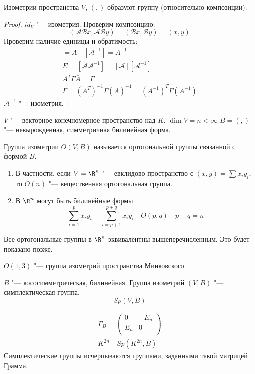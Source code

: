 \begin{conseq}
	Изометрии пространства $V$, $(,)$ образуют группу (относительно композиции).
\end{conseq}
\begin{proof}
	$id_V $  "--- изометрия.
	Проверим композицию:
	\[ (\mathcal A \mathcal B x, \mathcal A \mathcal B y) = (\mathcal B x, \mathcal B y) = (x, y) \]
	Проверим наличие единицы и обратимость:
	\begin{gather*}
		[\mathcal A ] = A \quad [\mathcal A ^{-1}] = A ^{-1} \\
		E = [\mathcal A \mathcal A ^{-1}] = [\mathcal A] [\mathcal A ^{-1}] \\
		A^T \Gamma \bar A  = \Gamma \\
		\Gamma = (A^T)^{-1} \Gamma (\bar A)^{-1} = (A^{-1})^T \Gamma \overline{(A^{-1})}
	\end{gather*}
	$\mathcal A^{-1}$ "--- изометрия.
\end{proof}

\begin{Def}
	$V$ "--- векторное конечномерное пространство над $K$. $\dim V = n < \infty$
	$B = (,)$ "--- невырожденная, симметричная билинейная форма.

	Группа изометрии $O(V, B)$ называется ортогональной группы связанной с формой $B$.  
\end{Def}
\begin{Def}
    \begin{enumerate}
    \item В частности, если $V = \R^n$ "--- евклидово пространство с $(x, y) = \sum x_i y_i$,
        	то $O(n)$ "--- вещественная ортогональная группа.
     \item  В $\R^n$ могут быть билинейные формы
     \[ \sum_{i = 1}^p x_iy_i - \sum_{i = p + 1}^{p + q} x_i y_i \quad O(p, q) \quad p + q = n \]
    \end{enumerate}
Все ортогональные группы в $\R^n$ эквивалентны вышеперечисленным.
Это будет показано позже.
\end{Def}
\begin{exmp}
$O(1, 3)$ "--- группа изометрий пространства Минковского.
\end{exmp}

\begin{Def}
	$B$ "--- кососимметрическая, билинейная.
	Группа изометрий $(V, B)$ "--- симплектическая группа.
	\[ Sp(V, B) \]
\end{Def}

\begin{exmp}
	\begin{gather*}
		\Gamma_B = \begin{pmatrix} 0 & -E_n \\ E_n & 0 \\ \end{pmatrix} \\
		K^{2n} \quad Sp(K^{2n}, B)
	\end{gather*}
	Симплектические группы исчерпываются группами, заданными такой матрицей Грамма.
\end{exmp}

